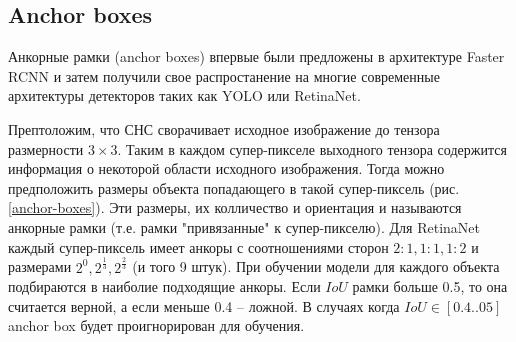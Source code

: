 \subsection{Anchor boxes}

Анкорные рамки (anchor boxes) впервые были предложены в архитектуре Faster RCNN и затем получили свое распростанение на многие современные архитектуры детекторов таких как YOLO или RetinaNet. 

Прептоложим, что СНС сворачивает исходное изображение до тензора размерности $3 \times 3$. Таким в каждом супер-пикселе выходного тензора содержится информация о некоторой области исходного изображения. Тогда можно предположить размеры объекта попадающего в такой супер-пиксель (рис. \ref{anchor-boxes}). Эти размеры, их колличество и ориентация и называются анкорные рамки (т.е. рамки "привязанные" к супер-пикселю). Для RetinaNet каждый супер-пиксель имеет анкоры с соотношениями сторон $2:1, 1:1, 1:2$ и размерами $2^0, 2^{\frac{1}{3}}, 2^{\frac{2}{3}}$ (и того 9 штук). При обучении модели для каждого объекта подбираются в наиболие подходящие анкоры. Если $IoU$ рамки больше 0.5, то она считается верной, а если меньше 0.4 -- ложной. В случаях когда $IoU \in [0.4 .. 05]$ anchor box будет проигнорирован для обучения.

